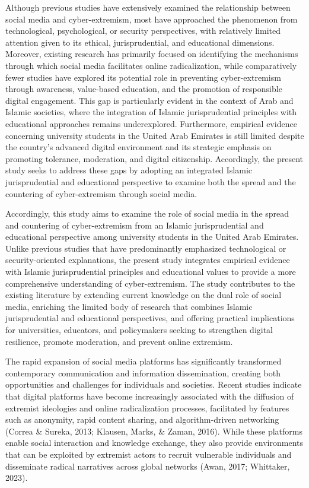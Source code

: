 \documentclass[10pt]{NSP1}
\begin{document}
Although previous studies have extensively examined the relationship between social media and cyber-extremism, most have approached the phenomenon from technological, psychological, or security perspectives, with relatively limited attention given to its ethical, jurisprudential, and educational dimensions. Moreover, existing research has primarily focused on identifying the mechanisms through which social media facilitates online radicalization, while comparatively fewer studies have explored its potential role in preventing cyber-extremism through awareness, value-based education, and the promotion of responsible digital engagement. This gap is particularly evident in the context of Arab and Islamic societies, where the integration of Islamic jurisprudential principles with educational approaches remains underexplored. Furthermore, empirical evidence concerning university students in the United Arab Emirates is still limited despite the country's advanced digital environment and its strategic emphasis on promoting tolerance, moderation, and digital citizenship. Accordingly, the present study seeks to address these gaps by adopting an integrated Islamic jurisprudential and educational perspective to examine both the spread and the countering of cyber-extremism through social media.

Accordingly, this study aims to examine the role of social media in the spread and countering of cyber-extremism from an Islamic jurisprudential and educational perspective among university students in the United Arab Emirates. Unlike previous studies that have predominantly emphasized technological or security-oriented explanations, the present study integrates empirical evidence with Islamic jurisprudential principles and educational values to provide a more comprehensive understanding of cyber-extremism. The study contributes to the existing literature by extending current knowledge on the dual role of social media, enriching the limited body of research that combines Islamic jurisprudential and educational perspectives, and offering practical implications for universities, educators, and policymakers seeking to strengthen digital resilience, promote moderation, and prevent online extremism.

\par\medskip{}\smallskip

The rapid expansion of social media platforms has significantly transformed contemporary communication and information dissemination, creating both opportunities and challenges for individuals and societies. Recent studies indicate that digital platforms have become increasingly associated with the diffusion of extremist ideologies and online radicalization processes, facilitated by features such as anonymity, rapid content sharing, and algorithm-driven networking (Correa \& Sureka, 2013; Klausen, Marks, \& Zaman, 2016). While these platforms enable social interaction and knowledge exchange, they also provide environments that can be exploited by extremist actors to recruit vulnerable individuals and disseminate radical narratives across global networks (Awan, 2017; Whittaker, 2023).
\end{document}
